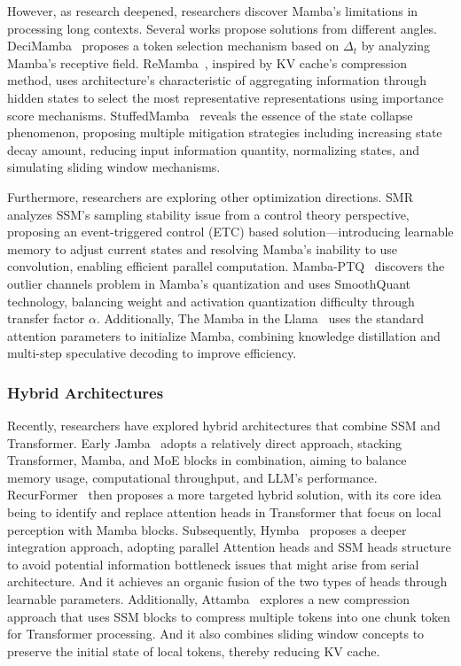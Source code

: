 However, as research deepened, researchers discover Mamba's limitations in processing long contexts. Several works propose solutions from different angles. DeciMamba~\citep{ben2024decimamba} proposes a token selection mechanism based on $\Delta_t$ by analyzing Mamba's receptive field. ReMamba~\citep{yuan2024remamba}, inspired by KV cache's compression method, uses architecture's characteristic of aggregating information through hidden states to select the most representative representations using importance score mechanisms. StuffedMamba~\citep{chen2024stuffed} reveals the essence of the state collapse phenomenon, proposing multiple mitigation strategies including increasing state decay amount, reducing input information quantity, normalizing states, and simulating sliding window mechanisms.

Furthermore, researchers are exploring other optimization directions. SMR~\citep{qi2024smr} analyzes SSM's sampling stability issue from a control theory perspective, proposing an event-triggered control (ETC) based solution—introducing learnable memory to adjust current states and resolving Mamba's inability to use convolution, enabling efficient parallel computation. Mamba-PTQ~\citep{pierro2024mamba} discovers the outlier channels problem in Mamba's quantization and uses SmoothQuant technology, balancing weight and activation quantization difficulty through transfer factor $\alpha$. Additionally, The Mamba in the Llama~\citep{wang2024mamba} uses the standard attention parameters to initialize Mamba, combining knowledge distillation and multi-step speculative decoding to improve efficiency.

\subsubsection{Hybrid Architectures}
Recently, researchers have explored hybrid architectures that combine SSM and Transformer. Early Jamba~\citep{lieber2024jamba} adopts a relatively direct approach, stacking Transformer, Mamba, and MoE blocks in combination, aiming to balance memory usage, computational throughput, and LLM's performance. RecurFormer~\citep{yan2024recurformer} then proposes a more targeted hybrid solution, with its core idea being to identify and replace attention heads in Transformer that focus on local perception with Mamba blocks. Subsequently, Hymba~\citep{dong2024hymba} proposes a deeper integration approach, adopting parallel Attention heads and SSM heads structure to avoid potential information bottleneck issues that might arise from serial architecture. And it achieves an organic fusion of the two types of heads through learnable parameters. Additionally, Attamba~\citep{akhauri2024attamba} explores a new compression approach that uses SSM blocks to compress multiple tokens into one chunk token for Transformer processing. And it also combines sliding window concepts to preserve the initial state of local tokens, thereby reducing KV cache.

